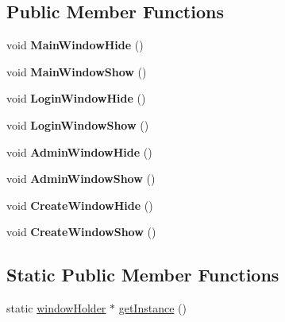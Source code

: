 \subsection*{Public Member Functions}
\begin{DoxyCompactItemize}
\item 
\mbox{\label{classwindow_holder_ab49515f6a1641726cc90cfe25c590dc9}} 
void {\bfseries Main\+Window\+Hide} ()
\item 
\mbox{\label{classwindow_holder_a896305f2187010582bec985c69732f50}} 
void {\bfseries Main\+Window\+Show} ()
\item 
\mbox{\label{classwindow_holder_ab8a34349cac278a51b2bbf58c32d2c8c}} 
void {\bfseries Login\+Window\+Hide} ()
\item 
\mbox{\label{classwindow_holder_ad360d5183c9b9121ee3533f55228cafe}} 
void {\bfseries Login\+Window\+Show} ()
\item 
\mbox{\label{classwindow_holder_aa459aa3bd4a409b838ea2c0b1be67f37}} 
void {\bfseries Admin\+Window\+Hide} ()
\item 
\mbox{\label{classwindow_holder_a0c97d703dc433ee2e20b89efa849780c}} 
void {\bfseries Admin\+Window\+Show} ()
\item 
\mbox{\label{classwindow_holder_a816f65a254c2636fa7221d401809bcc0}} 
void {\bfseries Create\+Window\+Hide} ()
\item 
\mbox{\label{classwindow_holder_af35553dd4cd1f109ce3b72835e3d7180}} 
void {\bfseries Create\+Window\+Show} ()
\end{DoxyCompactItemize}
\subsection*{Static Public Member Functions}
\begin{DoxyCompactItemize}
\item 
static \hyperlink{classwindow_holder}{window\+Holder} $\ast$ \hyperlink{classwindow_holder_a9e3b852dff2680e161c9cae0b1eaa11d}{get\+Instance} ()
\end{DoxyCompactItemize}



